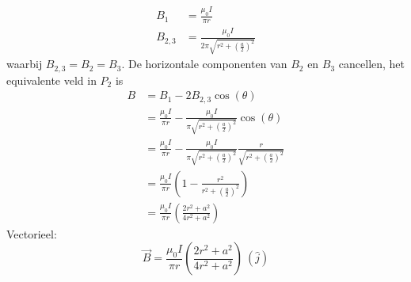 \begin{description}[labelwidth=1.5cm, leftmargin=!]
\begin{enumerate}[$P_1$:]
\begin{description}[labelwidth=1.5cm, leftmargin=!]
\begin{align*}
                        B_1 
                            &= \frac{\mu_0I}{\pi r} \\
                        B_{2,3} 
                            &=  \frac{\mu_0I}{2\pi \sqrt{r^2 + \left(\frac{a}{2}\right)^2}}
                    \end{align*}
                    waarbij $B_{2,3} = B_2 = B_3$. De horizontale componenten van $B_2$ en $B_3$ cancellen, het equivalente veld in $P_2$ is
                    \begin{align*}
                        B 
                            &= B_1 - 2B_{2,3}\cos(\theta) \\
                            &= \frac{\mu_0I}{\pi r} - \frac{\mu_0I}{\pi \sqrt{r^2 + \left(\frac{a}{2}\right)^2}}\cos(\theta) \\ 
                            &= \frac{\mu_0I}{\pi r} - \frac{\mu_0I}{\pi \sqrt{r^2 + \left(\frac{a}{2}\right)^2}} \frac{r}{\sqrt{r^2 + \left(\frac{a}{2}\right)^2}} \\ 
                            &= \frac{\mu_0I}{\pi r}\left(1 - \frac{r^2}{r^2 + \left(\frac{a}{2}\right)^2} \right) \\
                            &= \frac{\mu_0I}{\pi r}\left(\frac{2r^2+a^2}{4r^2+a^2}\right)
                    \end{align*}    
                    Vectorieel:
                    \begin{equation*}
                        \Vec{B} =\frac{\mu_0I}{\pi r}\left(\frac{2r^2+a^2}{4r^2+a^2}\right)\ (\hat{j})
                    \end{equation*}
                \end{description}
        \end{enumerate}

\end{description}
\vspace{1cm}